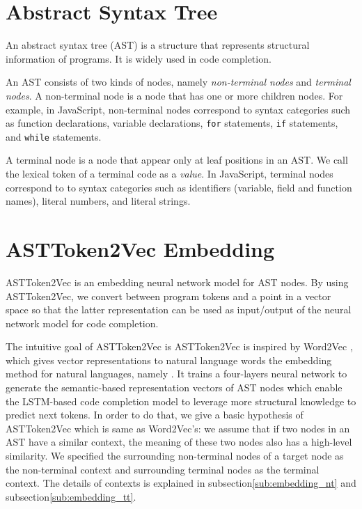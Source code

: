 \documentclass[E]{compsoft}
\begin{document}


\section{Abstract Syntax Tree}
An abstract syntax tree (AST) is a structure that represents structural information of programs. It is widely used in code completion.

An AST consists of two kinds of nodes, namely \emph{non-terminal nodes} and \emph{terminal nodes}.
A non-terminal node is a node that has one or more children nodes. 
For example, in JavaScript, non-terminal nodes correspond to syntax categories such as function declarations, variable declarations, \texttt{for} statements, \texttt{if} statements, and \texttt{while} statements.

A terminal node is a node that appear only at leaf positions in an AST.
We call the lexical token of a terminal code as a \emph{value}.
In JavaScript, terminal nodes correspond to to syntax categories such as identifiers (variable, field and function names), literal numbers, and literal strings.  




\section{ASTToken2Vec Embedding}
\label{section:node2vec}
ASTToken2Vec is an embedding neural network model for AST nodes.  By using ASTToken2Vec, we convert between program tokens and a point in a vector space so that the latter representation can be used as input/output of the neural network model for code completion.  

The intuitive goal of ASTToken2Vec is 
ASTToken2Vec is inspired by Word2Vec \cite{word2vec}, which gives vector representations to natural language words 
the embedding method for natural languages, namely . 
It trains a four-layers neural network to generate the semantic-based representation vectors of AST nodes which enable the LSTM-based code completion model to leverage more structural knowledge to predict next tokens.
In order to do that, we give a basic hypothesis of ASTToken2Vec which is same as Word2Vec's: we assume that if two nodes in an AST have a similar context, the meaning of these two nodes also has a high-level similarity. 
We specified the surrounding non-terminal nodes of a target node as the non-terminal context and surrounding terminal nodes as the terminal context. The details of contexts is explained in subsection\ref{sub:embedding_nt} and subsection\ref{sub:embedding_tt}.
\end{document}
